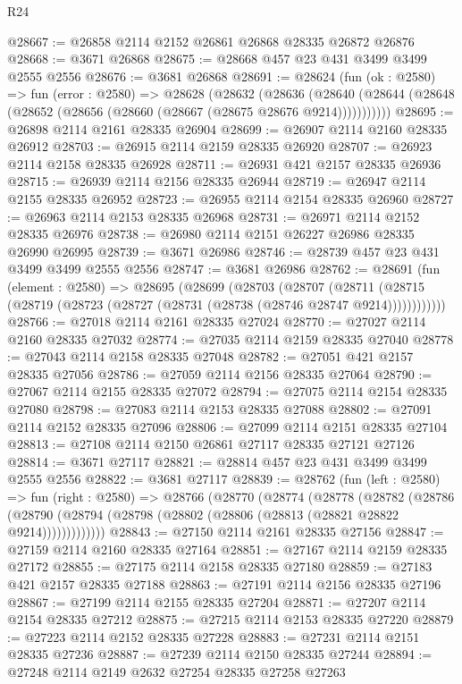 \begin{lexlean}{R24}
\begin{coremodule}
@28667 := @26858 @2114 @2152 @26861 @26868 @28335 @26872 @26876
@28668 := @3671 @26868
@28675 := @28668 @457 @23 @431 @3499 @3499 @2555 @2556
@28676 := @3681 @26868
@28691 := @28624
    (fun (ok : @2580) =>
    fun (error : @2580) =>
    @28628
      (@28632
        (@28636
          (@28640 (@28644 (@28648 (@28652 (@28656 (@28660 (@28667 (@28675 @28676 @9214)))))))))))
@28695 := @26898 @2114 @2161 @28335 @26904
@28699 := @26907 @2114 @2160 @28335 @26912
@28703 := @26915 @2114 @2159 @28335 @26920
@28707 := @26923 @2114 @2158 @28335 @26928
@28711 := @26931 @421 @2157 @28335 @26936
@28715 := @26939 @2114 @2156 @28335 @26944
@28719 := @26947 @2114 @2155 @28335 @26952
@28723 := @26955 @2114 @2154 @28335 @26960
@28727 := @26963 @2114 @2153 @28335 @26968
@28731 := @26971 @2114 @2152 @28335 @26976
@28738 := @26980 @2114 @2151 @26227 @26986 @28335 @26990 @26995
@28739 := @3671 @26986
@28746 := @28739 @457 @23 @431 @3499 @3499 @2555 @2556
@28747 := @3681 @26986
@28762 := @28691
    (fun (element : @2580) =>
    @28695
      (@28699
        (@28703
          (@28707
            (@28711 (@28715 (@28719 (@28723 (@28727 (@28731 (@28738 (@28746 @28747 @9214))))))))))))
@28766 := @27018 @2114 @2161 @28335 @27024
@28770 := @27027 @2114 @2160 @28335 @27032
@28774 := @27035 @2114 @2159 @28335 @27040
@28778 := @27043 @2114 @2158 @28335 @27048
@28782 := @27051 @421 @2157 @28335 @27056
@28786 := @27059 @2114 @2156 @28335 @27064
@28790 := @27067 @2114 @2155 @28335 @27072
@28794 := @27075 @2114 @2154 @28335 @27080
@28798 := @27083 @2114 @2153 @28335 @27088
@28802 := @27091 @2114 @2152 @28335 @27096
@28806 := @27099 @2114 @2151 @28335 @27104
@28813 := @27108 @2114 @2150 @26861 @27117 @28335 @27121 @27126
@28814 := @3671 @27117
@28821 := @28814 @457 @23 @431 @3499 @3499 @2555 @2556
@28822 := @3681 @27117
@28839 := @28762
    (fun (left : @2580) =>
    fun (right : @2580) =>
    @28766
      (@28770
        (@28774
          (@28778
            (@28782
              (@28786
                (@28790 (@28794 (@28798 (@28802 (@28806 (@28813 (@28821 @28822 @9214)))))))))))))
@28843 := @27150 @2114 @2161 @28335 @27156
@28847 := @27159 @2114 @2160 @28335 @27164
@28851 := @27167 @2114 @2159 @28335 @27172
@28855 := @27175 @2114 @2158 @28335 @27180
@28859 := @27183 @421 @2157 @28335 @27188
@28863 := @27191 @2114 @2156 @28335 @27196
@28867 := @27199 @2114 @2155 @28335 @27204
@28871 := @27207 @2114 @2154 @28335 @27212
@28875 := @27215 @2114 @2153 @28335 @27220
@28879 := @27223 @2114 @2152 @28335 @27228
@28883 := @27231 @2114 @2151 @28335 @27236
@28887 := @27239 @2114 @2150 @28335 @27244
@28894 := @27248 @2114 @2149 @2632 @27254 @28335 @27258 @27263

\end{coremodule}
\end{lexlean}
